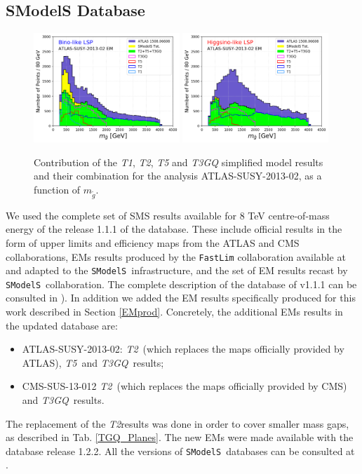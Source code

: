 \documentclass[preprint,number,sort&compress,twocolumn,3p]{elsstyarticle}
\newcommand{\SMO}{\texttt{SModelS\xspace}}
\newcommand{\MGLU}{$ m _{ \tilde g } $\xspace}
\newcommand{\TGQ}{ \textit{T3GQ}}
\newcommand{\Ttwo}{ \textit{T2}}
\newcommand{\Tfive}{ \textit{T5}}
\begin{document}
\subsection{SModelS Database}
\begin{figure}
	\begin{center}
		\subfigure
		{\includegraphics[width=0.49\textwidth]{PLOTS/Combination/Bino_Con.png}}
		\subfigure
		{\includegraphics[width=0.49\textwidth]{PLOTS/Combination/Higgsino_Con.png}}
	\end{center}
	\caption{Contribution of the \textit{T1}, \textit{T2}, \textit{T5} and \textit{T3GQ} simplified model results and their combination for the analysis ATLAS-SUSY-2013-02, as a function of \MGLU.} 
	\label{sms-histo}
\end{figure}
We used the complete set of SMS results available for 8 TeV centre-of-mass energy of the release 1.1.1 of the database. These include official results in the form of upper limits and efficiency maps from the ATLAS and CMS collaborations, EMs results produced by the \texttt{FastLim} collaboration available at \cite{fastlim:web} and adapted to the \SMO~infrastructure, and the set of EM results recast by \SMO~collaboration. The complete description of the database of v1.1.1 can be consulted in \cite{Ambrogi:2017lov}). In addition we added the EM results specifically produced for this work described in Section \ref{EMprod}. Concretely, the additional EMs results in the updated database are:
\begin{itemize}
	\item ATLAS-SUSY-2013-02: \Ttwo~(which replaces the maps officially provided by ATLAS), \Tfive~and \TGQ~results; \
	\item CMS-SUS-13-012 \Ttwo~(which replaces the maps officially provided by CMS) and \TGQ~results.
\end{itemize}
The replacement of the \Ttwo results was done in order to cover smaller mass gaps, as described in Tab. \ref{TGQ_Planes}. The new EMs were made available with the database release 1.2.2. All the versions of \SMO~databases can be consulted at \cite{databases}.
%
\end{document}

